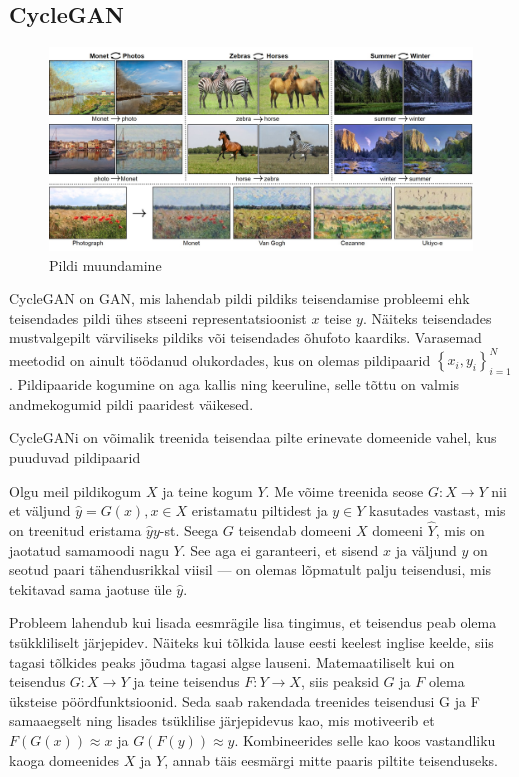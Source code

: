 \documentclass{vilgym}
\begin{document}
	\subsection{CycleGAN}
	\begin{figure}
		\centering
			\includegraphics[width=\linewidth]{images/cyclegan.jpg}
			\caption{Pildi muundamine}
			\label{fig:cyclegan}
	\end{figure}
	CycleGAN on GAN, mis lahendab pildi pildiks teisendamise probleemi ehk teisendades pildi ühes stseeni representatsioonist $ x $ teise $ y $. Näiteks teisendades mustvalgepilt värviliseks pildiks või teisendades õhufoto kaardiks. Varasemad meetodid on ainult töödanud olukordades, kus on olemas pildipaarid $ \left\{x_i,y_i\right\}_{i=1}^N $. Pildipaaride kogumine on aga kallis ning keeruline, selle tõttu on valmis andmekogumid pildi paaridest väikesed.

	
	CycleGANi on võimalik treenida teisendaa pilte erinevate domeenide vahel, kus puuduvad pildipaarid

	Olgu meil pildikogum $ X $ ja teine kogum $ Y $. Me võime treenida seose $ G: X \rightarrow Y $ nii et väljund $ \hat{y} = G(x), x \in X $ eristamatu piltidest ja $ y \in Y $ kasutades vastast, mis on treenitud eristama $ \hat{y} y $-st.
	Seega $ G $ teisendab domeeni $ X $ domeeni $ \hat{Y} $, mis on jaotatud samamoodi nagu $ Y $. See aga ei garanteeri, et sisend $ x $ ja väljund $ y $ on seotud paari tähendusrikkal viisil --- on olemas lõpmatult palju teisendusi, mis tekitavad sama jaotuse üle $ \hat{y} $.

	Probleem lahendub kui lisada eesmrägile lisa tingimus, et teisendus peab olema tsükkliliselt järjepidev. Näiteks kui tõlkida lause eesti keelest inglise keelde, siis tagasi tõlkides peaks jõudma tagasi algse lauseni. Matemaatiliselt kui on teisendus $ G: X \rightarrow Y $ ja teine teisendus $F: Y \rightarrow X $, siis peaksid $ G $ ja $ F $ olema üksteise pöördfunktsioonid.
	Seda saab rakendada treenides teisendusi G ja F samaaegselt ning lisades tsüklilise järjepidevus kao, mis motiveerib et $ F(G(x)) \approx x $ ja $ G(F(y)) \approx y $. Kombineerides selle kao koos vastandliku kaoga domeenides $ X $ ja $ Y $, annab täis eesmärgi mitte paaris piltite teisenduseks.
\end{document}
